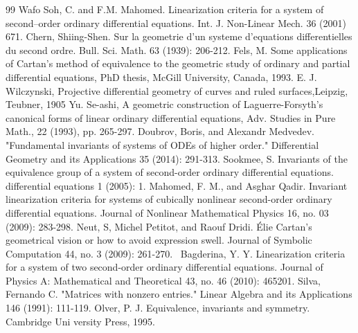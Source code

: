 \documentclass[12pt]{article}
\begin{document}
\begin{thebibliography}{99}
 Wafo Soh, C. and F.M. Mahomed. Linearization criteria for a system of second–order ordinary differential equations.  Int. J. Non-Linear Mech. 36 (2001) 671.
Chern, Shiing-Shen. Sur la geometrie d’un systeme d’equations differentielles du second
ordre. Bull. Sci. Math. 63 (1939): 206-212.
 Fels, M. Some applications of Cartan's method of equivalence to the geometric study of
ordinary and partial differential equations, PhD thesis, McGill University, Canada, 1993.
E. J. Wilczynski, Projective differential geometry of curves and ruled surfaces,Leipzig, Teubner, 1905
Yu. Se-ashi, A geometric construction of Laguerre-Forsyth’s canonical forms of linear ordinary differential equations, Adv. Studies in Pure Math., 22 (1993), pp. 265-297.
Doubrov, Boris, and Alexandr Medvedev. "Fundamental invariants of systems of ODEs of higher order." Differential Geometry and its Applications 35 (2014): 291-313.
 Sookmee, S. Invariants of the equivalence group of a system of second-order ordinary differential equations. differential equations 1 (2005): 1.
 Mahomed, F. M., and Asghar Qadir. Invariant linearization criteria for systems of cubically nonlinear second-order ordinary differential equations. Journal of Nonlinear Mathematical Physics 16, no. 03 (2009): 283-298.
 Neut, S, Michel Petitot, and Raouf Dridi. Élie Cartan’s geometrical vision or how to avoid expression swell. Journal of Symbolic Computation 44, no. 3 (2009): 261-270.\
 Bagderina, Y. Y. Linearization criteria for a system of two second-order ordinary differential equations. Journal of Physics A: Mathematical and Theoretical 43, no. 46 (2010): 465201.
\bibitem{p47}Silva, Fernando C. "Matrices with nonzero entries." Linear Algebra and its Applications 146 (1991): 111-119.\bibitem{R6} Olver, P. J. Equivalence, invariants and symmetry. Cambridge Uni
versity Press, 1995.
\end{thebibliography}
\appendix
\footnotesize

\end{document}
